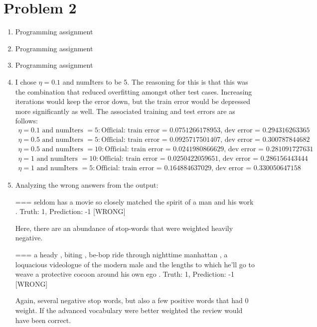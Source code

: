 \documentclass[12pt]{article}
\begin{document}
	\section*{Problem 2}

	\begin{enumerate}[label=(\alph*)]
		\item Programming assignment 
		\item Programming assignment 
		\item Programming assignment 

		\item I chose \(\eta = 0.1\) and numIters to be 5. The reasoning for this
			is that this was the combination that reduced overfitting amongst other
			test cases. Increasing iterations would keep the error down, but the 
			train error would be depressed more significantly as well.
			The associated training and test errors are as follows:
			\begin{gather*}
				\eta = 0.1 \text{ and numIters }= 5:
					\text{Official: train error = 0.0751266178953, dev error = 0.294316263365} \\
				\eta = 0.5 \text{ and numIters }= 5:
					\text{Official: train error = 0.0925717501407, dev error = 0.300787844682} \\
				\eta = 0.5 \text{ and numIters }= 10:
					\text{Official: train error = 0.0241980866629, dev error = 0.281091727631} \\
				\eta = 1 \text{ and numIters }= 10:
					\text{Official: train error = 0.0250422059651, dev error = 0.286156443444} \\
				\eta = 1 \text{ and numIters }= 5:
					\text{Official: train error = 0.164884637029, dev error = 0.330050647158}
			\end{gather*}

		\item Analyzing the wrong answers from the output:

			=== seldom has a movie so closely matched the spirit of a man and his work .
			Truth: 1, Prediction: -1 [WRONG]

				Here, there are an abundance of stop-words that were weighted heavily negative.

			=== a heady , biting , be-bop ride through nighttime manhattan , a loquacious videologue of the modern male and the lengths to which he'll go to weave a protective cocoon around his own ego .
			Truth: 1, Prediction: -1 [WRONG]

				Again, several negative stop words, but also a few positive words that had 0 weight. If the advanced vocabulary were better weighted the review would have been correct.


\end{enumerate}
\end{document}
